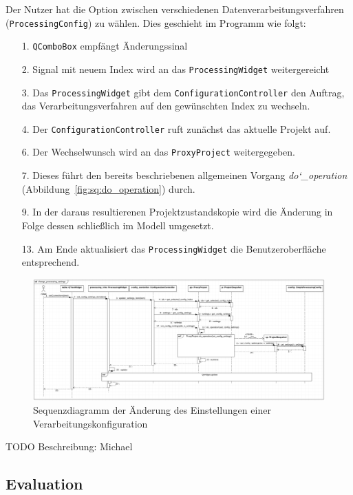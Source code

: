 \documentclass{article}
\begin{document}
\begin{itemize}
Der Nutzer hat die Option zwischen verschiedenen Datenverarbeitungsverfahren (\texttt{ProcessingConfig}) zu wählen. Dies geschieht im Programm wie folgt:
\begin{enumerate}
    \item[1.] \texttt{QComboBox} empfängt Änderungssinal
    \item[2.] Signal mit neuem Index wird an das \texttt{ProcessingWidget} weitergereicht
    \item[3.] Das \texttt{ProcessingWidget} gibt dem \texttt{ConfigurationController} den Auftrag, das Verarbeitungsverfahren auf den gewünschten Index zu wechseln.
    \item[4.] Der \texttt{ConfigurationController} ruft zunächst das aktuelle Projekt auf.
    \item[6.] Der Wechselwunsch wird an das \texttt{ProxyProject} weitergegeben.
    \item[7.] Dieses führt den bereits beschriebenen allgemeinen Vorgang \emph{do\char`_operation} (Abbildung~\ref{fig:sq:do_operation}) durch.
    \item[9.] In der daraus resultierenen Projektzustandskopie wird die Änderung in Folge dessen schließlich im Modell umgesetzt.
    \item[13.] Am Ende aktualisiert das \texttt{ProcessingWidget} die Benutzeroberfläche entsprechend.
\end{enumerate}

\begin{figure}[H]%
    \centering
    \includegraphics[width=13cm]{entwurf/Entwurf_dokument/img/Michael/sd_change_processing_settings.png}
    \caption{Sequenzdiagramm der Änderung des Einstellungen einer Verarbeitungskonfiguration}
\end{figure}

TODO Beschreibung: Michael


\subsection{Evaluation}


\end{itemize}
\end{document}
